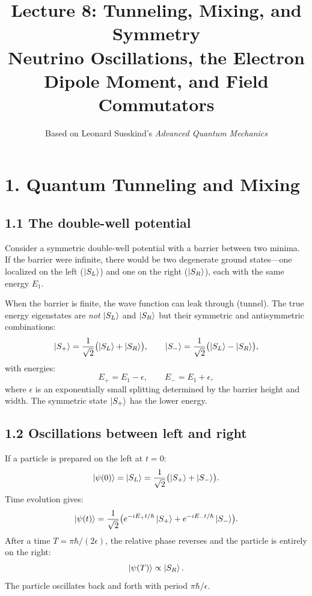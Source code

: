 \documentclass[12pt,a4paper]{article}
\title{\textbf{Lecture 8: Tunneling, Mixing, and Symmetry} \\ \large Neutrino Oscillations, the Electron Dipole Moment, and Field Commutators}
\author{Based on Leonard Susskind's \textit{Advanced Quantum Mechanics}}
\date{}
\begin{document}
\maketitle
\thispagestyle{fancy}

\section{1. Quantum Tunneling and Mixing}

\subsection{1.1 The double-well potential}

Consider a symmetric double-well potential with a barrier between two minima.  If the barrier were infinite, there would be two degenerate ground states---one localized on the left ($\ket{S_L}$) and one on the right ($\ket{S_R}$), each with the same energy $E_1$.

When the barrier is finite, the wave function can leak through (tunnel).  The true energy eigenstates are \emph{not} $\ket{S_L}$ and $\ket{S_R}$ but their symmetric and antisymmetric combinations:
\[
    \ket{S_+} = \frac{1}{\sqrt{2}}\bigl(\ket{S_L} + \ket{S_R}\bigr), \qquad
    \ket{S_-} = \frac{1}{\sqrt{2}}\bigl(\ket{S_L} - \ket{S_R}\bigr),
\]
with energies:
\[
    E_+ = E_1 - \epsilon, \qquad E_- = E_1 + \epsilon,
\]
where $\epsilon$ is an exponentially small splitting determined by the barrier height and width.  The symmetric state $\ket{S_+}$ has the lower energy.

\subsection{1.2 Oscillations between left and right}

If a particle is prepared on the left at $t = 0$:
\[
    \ket{\psi(0)} = \ket{S_L} = \frac{1}{\sqrt{2}}\bigl(\ket{S_+} + \ket{S_-}\bigr).
\]
Time evolution gives:
\[
    \ket{\psi(t)} = \frac{1}{\sqrt{2}}\bigl(e^{-iE_+ t/\hbar}\ket{S_+} + e^{-iE_- t/\hbar}\ket{S_-}\bigr).
\]
After a time $T = \pi\hbar/(2\epsilon)$, the relative phase reverses and the particle is entirely on the right:
\[
    \ket{\psi(T)} \propto \ket{S_R}.
\]
The particle oscillates back and forth with period $\pi\hbar/\epsilon$.

\end{document}
